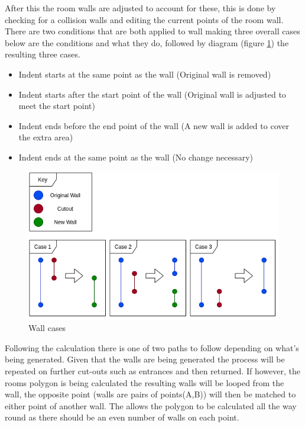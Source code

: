 After this the room walls are adjusted to account for these, this is done by checking for a collision walls and editing the current points of the room wall. There are two conditions that are both applied to wall making three overall cases below are the conditions and what they do, followed by diagram (figure \ref{fig:wallcases}) the resulting three cases.
\begin{itemize}
	\item Indent starts at the same point as the wall (Original wall is removed)
	\item Indent starts after the start point of the wall (Original wall is adjusted to meet the start point)
	\item Indent ends before the end point of the wall (A new wall is added to cover the extra area)
	\item Indent ends at the same point as the wall (No change necessary)	
\end{itemize}
\begin{figure}[h]
	\centering
	\includegraphics[width=\linewidth]{images/implementation/wallconditions.png}
	\caption{Wall cases}
	\label{fig:wallcases}
\end{figure}

Following the calculation there is one of two paths to follow depending on what's being generated. Given that the walls are being generated the process will be repeated on further cut-outs such as entrances and then returned. If however, the rooms polygon is being calculated the resulting walls will be looped from the wall, the opposite point (walls are pairs of points(A,B)) will then be matched to either point of another wall. The allows the polygon to be calculated all the way round as there should be an even number of walls on each point.

